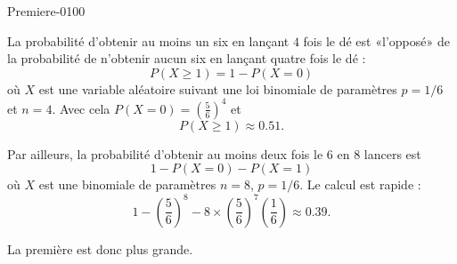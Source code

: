 
\begin{corrige}{Premiere-0100}

La probabilité d'obtenir au moins un six en lançant \( 4\) fois le dé est «l'opposé» de la probabilité de n'obtenir aucun six en lançant quatre fois le dé :
\begin{equation}
    P(X\geq 1)=1-P(X=0)
\end{equation}
où \( X\) est une variable aléatoire suivant une loi binomiale de paramètres \( p=1/6\) et \( n=4\). Avec cela \( P(X=0)=\left( \frac{ 5 }{ 6 } \right)^4\) et
\begin{equation}
    P(X\geq 1)\approx 0.51.
\end{equation}

Par ailleurs, la probabilité d'obtenir au moins deux fois le \( 6\) en \( 8\) lancers est
\begin{equation}
    1-P(X=0)-P(X=1)
\end{equation}
où \( X\) est une binomiale de paramètres \( n=8\), \( p=1/6\). Le calcul est rapide :
\begin{equation}
    1-\left( \frac{ 5 }{ 6 } \right)^8-8\times \left( \frac{ 5 }{ 6 } \right)^7\left( \frac{1}{ 6 } \right)\approx 0.39.
\end{equation}

La première est donc plus grande.

\end{corrige}
